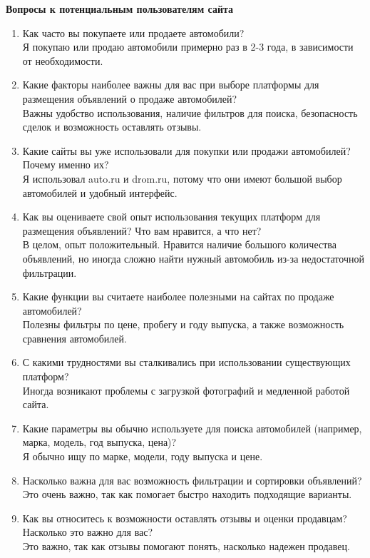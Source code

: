 \textbf{Вопросы к потенциальным пользователям сайта}
\bigskip

\begin{enumerate}
    \item Как часто вы покупаете или продаете автомобили?\\
        Я покупаю или продаю автомобили примерно раз в 2-3 года, в зависимости от необходимости.
    \item Какие факторы наиболее важны для вас при выборе платформы для размещения объявлений о продаже автомобилей?\\
        Важны удобство использования, наличие фильтров для поиска, безопасность сделок и возможность оставлять отзывы.
    \item Какие сайты вы уже использовали для покупки или продажи автомобилей? Почему именно их?\\
        Я использовал auto.ru и drom.ru, потому что они имеют большой выбор автомобилей и удобный интерфейс.
    \item Как вы оцениваете свой опыт использования текущих платформ для размещения объявлений? Что вам нравится, а что нет?\\
        В целом, опыт положительный. Нравится наличие большого количества объявлений, но иногда сложно найти нужный автомобиль из-за недостаточной фильтрации.
    \item Какие функции вы считаете наиболее полезными на сайтах по продаже автомобилей?\\
        Полезны фильтры по цене, пробегу и году выпуска, а также возможность сравнения автомобилей.
    \item С какими трудностями вы сталкивались при использовании существующих платформ?\\
        Иногда возникают проблемы с загрузкой фотографий и медленной работой сайта.
    \item Какие параметры вы обычно используете для поиска автомобилей (например, марка, модель, год выпуска, цена)?\\
        Я обычно ищу по марке, модели, году выпуска и цене.
    \item Насколько важна для вас возможность фильтрации и сортировки объявлений?\\
        Это очень важно, так как помогает быстро находить подходящие варианты.
    \item Как вы относитесь к возможности оставлять отзывы и оценки продавцам? Насколько это важно для вас?\\
        Это важно, так как отзывы помогают понять, насколько надежен продавец.

\end{enumerate}
